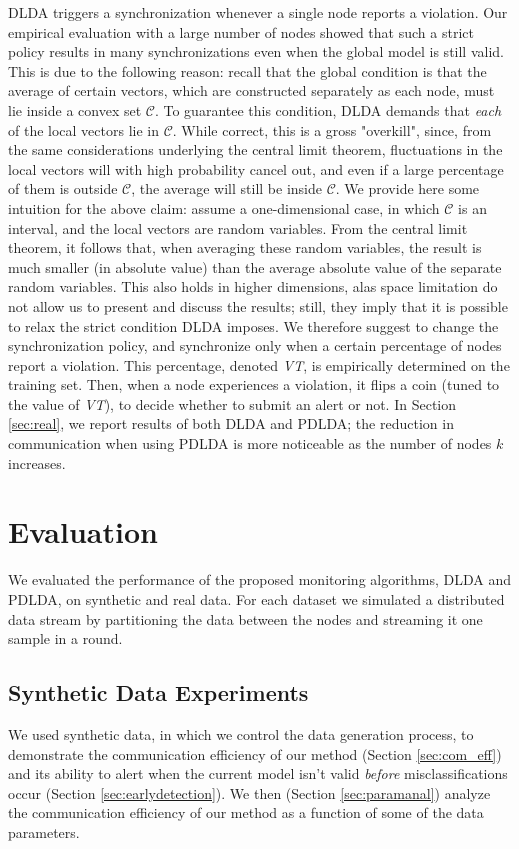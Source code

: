 \label{sec:PDLDA}
DLDA triggers a synchronization whenever a single node reports a violation.
Our empirical evaluation with a large number of nodes showed that such a strict
policy results in many synchronizations even when the global model is still 
valid. This is due to the following reason: 
recall that the global condition
is that the average of certain vectors,
which are constructed separately as each node, must lie inside a convex set $\mathcal{C}$.
To guarantee this condition, DLDA demands that {\em each} of the local vectors lie in
$\mathcal{C}$. While correct, this is a gross "overkill", since, from
the same considerations underlying the central limit theorem,
fluctuations in the local vectors will with high probability cancel out, and even if a large
percentage of them is outside $\mathcal{C}$, the average will still be inside
$\mathcal{C}$. We provide here some intuition for the above claim: assume a one-dimensional
case, in which $\mathcal{C}$ is an interval, and the local vectors are random
variables. From the central limit theorem, it follows that, when averaging these
random variables, the result is much smaller (in absolute value) than the
average absolute value of the separate random variables. This also holds 
in higher dimensions, alas space limitation do not allow us to present and discuss the results; still, they imply that it is possible to relax the strict
condition DLDA imposes. 
We therefore suggest to change the synchronization policy, and synchronize only when a certain 
percentage of nodes report a violation.
This percentage, denoted {\em VT}, is empirically determined on the training set. Then,
when a node experiences a violation, it flips a coin (tuned to the value of {\em VT}),
to decide whether to submit an alert or not. In Section \ref{sec:real}, we report
results of both DLDA and PDLDA; the reduction in communication when using
PDLDA is more noticeable as the number of nodes $k$ increases.
%
%
%
\section{Evaluation}
%
We evaluated the performance of the proposed monitoring algorithms, DLDA and PDLDA, on synthetic and real data. For each dataset we simulated a distributed data stream by partitioning the data between the nodes and streaming it one sample in a round. 

\subsection{Synthetic Data Experiments}
We used synthetic data, in which we control the data generation process, to
demonstrate the communication efficiency of our method (Section \ref{sec:com_eff})
and its ability to alert when the current model isn't valid \emph{before} 
misclassifications occur (Section \ref{sec:earlydetection}). We then (Section \ref{sec:paramanal}) analyze the communication efficiency of our method as a function of
some of the data parameters.
%
%
